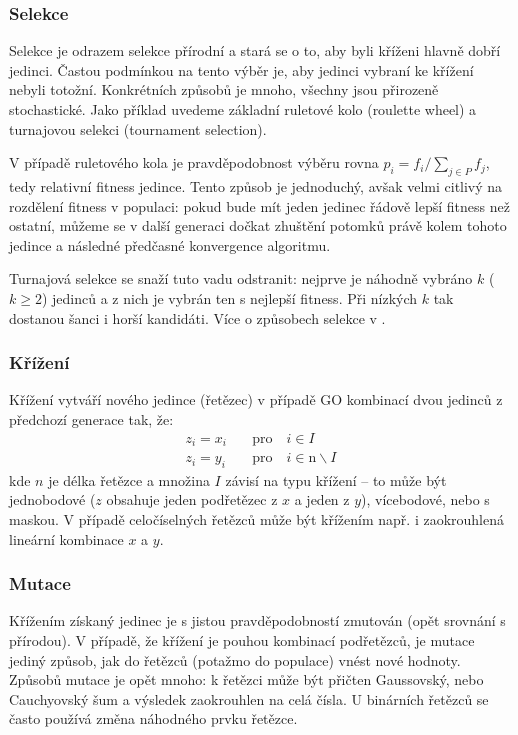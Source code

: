 \subsubsection{Selekce}

Selekce je odrazem selekce přírodní a stará se o to, aby byli kříženi hlavně dobří jedinci. Častou podmínkou na tento výběr je, aby jedinci vybraní ke křížení nebyli totožní. Konkrétních způsobů je mnoho, všechny jsou přirozeně stochastické. Jako příklad uvedeme základní ruletové kolo (roulette wheel) a turnajovou selekci (tournament selection).

V případě ruletového kola je pravděpodobnost výběru rovna $p_i = f_i/\sum_{j \in P} f_j$, tedy relativní fitness jedince. Tento způsob je jednoduchý, avšak velmi citlivý na rozdělení fitness v populaci: pokud bude mít jeden jedinec řádově lepší fitness než ostatní, můžeme se v další generaci dočkat zhuštění potomků právě kolem tohoto jedince a následné předčasné konvergence algoritmu.

Turnajová selekce se snaží tuto vadu odstranit: nejprve je náhodně vybráno $k$ ($k\geq 2$) jedinců a z nich je vybrán ten s nejlepší fitness. Při nízkých $k$ tak dostanou šanci i horší kandidáti. Více o způsobech selekce v \cite{GO ebook}.

\subsubsection{Křížení}

Křížení vytváří nového jedince (řetězec) v případě GO kombinací dvou jedinců z předchozí generace tak, že:
\[
\begin{split}
z_i = x_i &\quad\text{pro}\quad i \in I \\
z_i = y_i &\quad\text{pro}\quad i \in \text{\^{n}}\backslash I
\end{split}
\]
kde $n$ je délka řetězce a množina $I$ závisí na typu křížení -- to může být jednobodové ($z$ obsahuje jeden podřetězec z $x$ a jeden z $y$), vícebodové, nebo s maskou. V případě celočíselných řetězců může být křížením např. i zaokrouhlená lineární kombinace $x$ a $y$.

\subsubsection{Mutace}

Křížením získaný jedinec je s jistou pravděpodobností zmutován (opět srovnání s přírodou). V případě, že křížení je pouhou kombinací podřetězců, je mutace jediný způsob, jak do řetězců (potažmo do populace) vnést nové hodnoty. Způsobů mutace je opět mnoho: k řetězci může být přičten Gaussovský, nebo Cauchyovský šum a výsledek zaokrouhlen na celá čísla. U binárních řetězců se často používá změna náhodného prvku řetězce.

